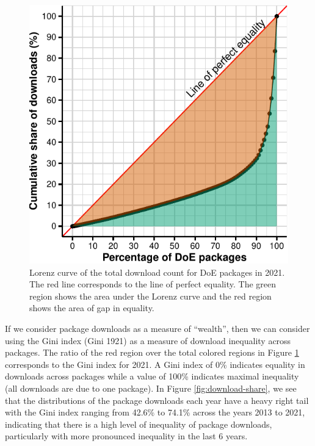 \documentclass{article}
\begin{document}
\begin{figure}[htbp]

{\centering \includegraphics{figures/plot-lorenz-1} 

}

\caption{Lorenz curve of the total download count for DoE packages in 2021. The red line corresponds to the line of perfect equality. The green region shows the area under the Lorenz curve and the red region shows the area of gap in equality.}\label{fig:plot-lorenz}
\end{figure}

If we consider package downloads as a measure of ``wealth'', then we can
consider using the Gini index (Gini 1921) as a measure of download
inequality across packages. The ratio of the red region over the total
colored regions in Figure \ref{fig:plot-lorenz} corresponds to the Gini
index for 2021. A Gini index of 0\% indicates equality in downloads
across packages while a value of 100\% indicates maximal inequality (all
downloads are due to one package). In Figure \ref{fig:download-share},
we see that the distributions of the package downloads each year have a
heavy right tail with the Gini index ranging from 42.6\% to 74.1\%
across the years 2013 to 2021, indicating that there is a high level of
inequality of package downloads, particularly with more pronounced
inequality in the last 6 years.
\end{document}
